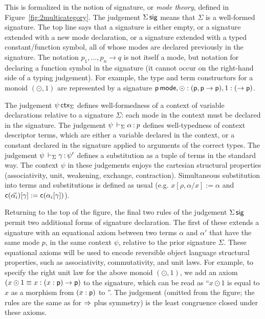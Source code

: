 This is formalized in the notion of signature, or \emph{mode theory},
defined in Figure~\ref{fig:2multicategory}.  The judgement $\Sigma \, \mathsf{sig}$ means that $\Sigma$ is a well-formed signature.  The top line
says that a signature is either empty, or a signature extended with a
new mode declaration, or a signature extended with a typed
constant/function symbol, all of whose modes are declared previously in
the signature.  The notation $p_1,\ldots,p_n \to q$ is not itself a
mode, but notation for declaring a function symbol in the signature (it
cannot occur on the right-hand side of a typing judgement).  For
example, the type and term constructors for a monoid $(\odot,1)$ are
represented by a signature $\mathsf{p} \, \mathsf{mode}, \mathsf{\odot} :
(\mathsf{p},\mathsf{p} \to \mathsf{p}), 1 : (\to \mathsf{p})$.

{
The judgement $\psi \, \mathsf{ctx}_\Sigma$ defines well-formedness of a
context of variable declarations relative to a signature $\Sigma$: each
mode in the context must be declared in the signature.}  The judgement
$\psi \,\vdash_{\Sigma} \mathit{\alpha} \, \mathit{:} \, \mathit{p}$ defines well-typedness of context
descriptor terms, which are either a variable declared in the context,
or a constant declared in the signature applied to arguments of the
correct types.  The judgement $\psi \,\vdash_{\Sigma} \mathit{\gamma} \, \mathit{:} \, \mathit{\psi'}$
defines a substitution as a tuple of terms in the standard way.  The
context $\psi$ in these judgements enjoys the cartesian structural
properties (associativity, unit, weakening, exchange, contraction).
Simultaneous substitution into terms and substitutions is defined as
usual (e.g.  $x[\rho,\alpha/x] := \alpha$ and
$\mathsf{c}(\vec{\alpha_i})[\gamma] := \mathsf{c}(\alpha_i[\gamma])$).

Returning to the top of the figure, the final two rules of the judgement
$\Sigma \, \mathsf{sig}$ permit two additional forms of signature declaration.
The first of these extends a signature with an equational axiom between
two terms $\alpha$ and $\alpha'$ that have the same mode $p$, in the
same context $\psi$, relative to the prior signature $\Sigma$.  These
equational axioms will be used to encode reversible object language
structural properties, such as associativity, commutativity, and unit
laws.  For example, to specify the right unit law for the above monoid
$(\odot,1)$, we add an axiom $(x \odot 1 \equiv x : (x : \mathsf{p}) \to
\mathsf{p})$ to the signature, which can be read as ``$x \odot 1$ is equal
to $x$ as a morphism from $(x : \mathsf{p})$ to ''.  The judgement
 (omitted from the figure; the
rules are the same as for $\Rightarrow$ plus symmetry) is the least congruence
closed under these axioms.

